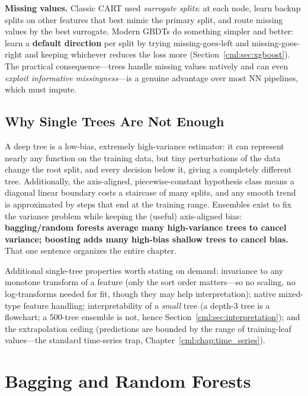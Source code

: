 \textbf{Missing values.} Classic CART used \textit{surrogate splits}: at each node, learn backup splits on other features that best mimic the primary split, and route missing values by the best surrogate. Modern GBDTs do something simpler and better: learn a \textbf{default direction} per split by trying missing-goes-left and missing-goes-right and keeping whichever reduces the loss more (Section~\ref{cml:sec:xgboost}). The practical consequence---trees handle missing values natively and can even \textit{exploit informative missingness}---is a genuine advantage over most NN pipelines, which must impute.

\subsection{Why Single Trees Are Not Enough}

\begin{keyinsight}
A deep tree is a low-bias, extremely high-variance estimator: it can represent nearly any function on the training data, but tiny perturbations of the data change the root split, and every decision below it, giving a completely different tree. Additionally, the axis-aligned, piecewise-constant hypothesis class means a diagonal linear boundary costs a staircase of many splits, and any smooth trend is approximated by steps that end at the training range. Ensembles exist to fix the variance problem while keeping the (useful) axis-aligned bias: \textbf{bagging/random forests average many high-variance trees to cancel variance; boosting adds many high-bias shallow trees to cancel bias.} That one sentence organizes the entire chapter.
\end{keyinsight}

Additional single-tree properties worth stating on demand: invariance to any monotone transform of a feature (only the sort order matters---so no scaling, no log-transforms needed for fit, though they may help interpretation); native mixed-type feature handling; interpretability of a \textit{small} tree (a depth-3 tree is a flowchart; a 500-tree ensemble is not, hence Section~\ref{cml:sec:interpretation}); and the extrapolation ceiling (predictions are bounded by the range of training-leaf values---the standard time-series trap, Chapter~\ref{cml:chap:time_series}).

\section{Bagging and Random Forests}
\label{cml:sec:bagging_rf}

